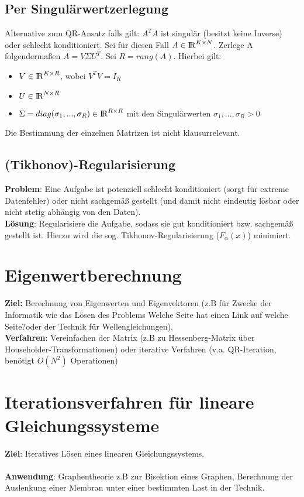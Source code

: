 \documentclass[10pt,a4paper]{article}
\def\realnumbers{{\rm I\!R}}
\begin{document}
	\subsection{Per Singulärwertzerlegung}
	Alternative zum QR-Ansatz falls gilt: $A^TA$ ist singulär (besitzt keine Inverse) oder schlecht konditioniert. Sei für diesen Fall $A \in \realnumbers^{K\times N}$. Zerlege A folgendermaßen $A = V\Sigma U^T$. Sei $R = rang(A)$. Hierbei gilt:
	\begin{itemize}
		\item $V \in \realnumbers^{K\times R}$, wobei $V^TV = I_R$
		\item $U \in \realnumbers^{N\times R}$
		\item $\Sigma = diag(\sigma_1, ..., \sigma_R) \in \realnumbers^{R\times R}$ mit den Singulärwerten $\sigma_1, ..., \sigma_R > 0$
	\end{itemize}
	Die Bestimmung der einzelnen Matrizen ist nicht klausurrelevant.
	
	\subsection{(Tikhonov)-Regularisierung}
	\textbf{Problem}: Eine Aufgabe ist potenziell schlecht konditioniert (sorgt für extreme Datenfehler) oder nicht sachgemäß gestellt (und damit nicht eindeutig lösbar oder nicht stetig abhängig von den Daten).\\
	\textbf{Lösung}: Regularisiere die Aufgabe, sodass sie gut konditioniert bzw. sachgemäß gestellt ist. Hierzu wird die sog. Tikhonov-Regularisierung ($F_\alpha(x)$) minimiert.
	
	\section{Eigenwertberechnung}
	\textbf{Ziel:} Berechnung von Eigenwerten und Eigenvektoren (z.B für Zwecke der Informatik wie das Lösen des Problems \glqq Welche Seite hat einen Link auf welche Seite?\grqq oder der Technik für Wellengleichungen).\\
	\textbf{Verfahren}: Vereinfachen der Matrix (z.B zu Hessenberg-Matrix über Householder-Transformationen) oder iterative Verfahren (v.a. QR-Iteration, benötigt $O(N^2)$ Operationen)

	\section{Iterationsverfahren für lineare Gleichungssysteme}
	\textbf{Ziel}: Iteratives Lösen eines linearen Gleichungssystems.\\\\
	\textbf{Anwendung}: Graphentheorie z.B zur Bisektion eines Graphen, Berechnung der Auslenkung einer Membran unter einer bestimmten Last in der Technik.
\end{document}
